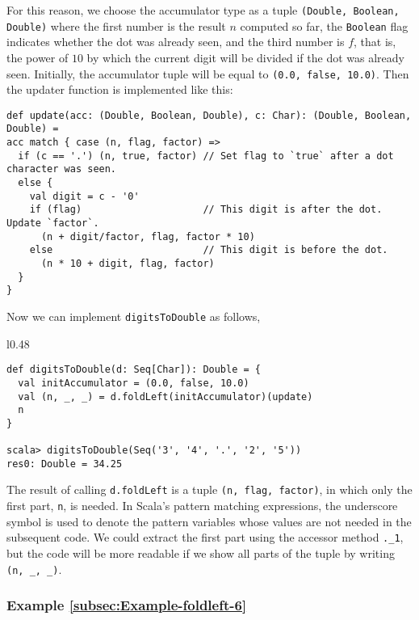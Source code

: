 For this reason, we choose the accumulator type as a tuple \lstinline!(Double, Boolean, Double)!
where the first number is the result $n$ computed so far, the \lstinline!Boolean!
flag indicates whether the dot was already seen, and the third number
is $f$, that is, the power of $10$ by which the current digit will
be divided if the dot was already seen. Initially, the accumulator
tuple will be equal to \lstinline!(0.0, false, 10.0)!. Then the updater
function is implemented like this:
\begin{lstlisting}
def update(acc: (Double, Boolean, Double), c: Char): (Double, Boolean, Double) =
acc match { case (n, flag, factor) =>
  if (c == '.') (n, true, factor) // Set flag to `true` after a dot character was seen.
  else {
    val digit = c - '0'
    if (flag)                     // This digit is after the dot. Update `factor`.
      (n + digit/factor, flag, factor * 10)
    else                          // This digit is before the dot.
      (n * 10 + digit, flag, factor)
  }
}
\end{lstlisting}
Now we can implement \lstinline!digitsToDouble! as follows,

\begin{wrapfigure}{l}{0.48\columnwidth}%
\vspace{-0.75\baselineskip}
\begin{lstlisting}
def digitsToDouble(d: Seq[Char]): Double = {
  val initAccumulator = (0.0, false, 10.0)
  val (n, _, _) = d.foldLeft(initAccumulator)(update)
  n
}

scala> digitsToDouble(Seq('3', '4', '.', '2', '5'))
res0: Double = 34.25
\end{lstlisting}

\vspace{-1.5\baselineskip}
\end{wrapfigure}%

\noindent The result of calling \lstinline!d.foldLeft! is a tuple
\lstinline!(n, flag, factor)!, in which only the first part, \lstinline!n!,
is needed. In Scala's pattern matching expressions, the underscore
symbol is used to denote the pattern variables whose values are not
needed in the subsequent code. We could extract the first part using
the accessor method \lstinline!._1!, but the code will be more readable
if we show all parts of the tuple by writing \lstinline!(n, _, _)!.

\subsubsection{Example \label{subsec:Example-foldleft-6}\ref{subsec:Example-foldleft-6}}


